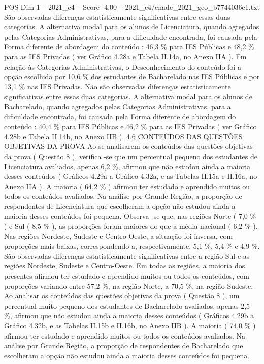 \begin{textsample}{POS Dim 1 – 2021\_c4 – Score -4.00 – 2021\_c4/enade\_2021\_geo\_b7744036e1.txt}
São observadas diferenças estatisticamente significativas entre essas duas categorias.
A alternativa modal para os alunos de Licenciatura, quando agregados pelas Categorias Administrativas, para a dificuldade encontrada, foi causada pela Forma diferente de abordagem do conteúdo : 46,3 \% para IES Públicas e 48,2 \% para as IES Privadas ( ver Gráfico 4.28a e Tabela II.14a, no Anexo IIA ).
Em relação às Categorias Administrativas, o Desconhecimento do conteúdo foi a opção escolhida por 10,6 \% dos estudantes de Bacharelado nas IES Públicas e por 13,1 \% nas IES Privadas.
Não são observadas diferenças estatisticamente significativas entre essas duas categorias.
A alternativa modal para os alunos de Bacharelado, quando agregados pelas Categorias Administrativas, para a dificuldade encontrada, foi causada pela Forma diferente de abordagem do conteúdo : 40,4 \% para IES Públicas e 46,2 \% para as IES Privadas ( ver Gráfico 4.28b e Tabela II.14b, no Anexo IIB ). 4.6 CONTEÚDOS DAS QUESTÕES OBJETIVAS DA PROVA Ao se analisarem os conteúdos das questões objetivas da prova ( Questão 8 ), verifica -se que um percentual pequeno dos estudantes de Licenciatura avaliados, apenas 6,2 \%, afirmou que não estudou ainda a maioria desses conteúdos ( Gráficos 4.29a a Gráfico 4.32a, e as Tabelas II.15a e II.16a, no Anexo IIA ).
A maioria ( 64,2 \% ) afirmou ter estudado e aprendido muitos ou todos os conteúdos avaliados.
Na análise por Grande Região, a proporção de respondentes de Licenciatura que escolheram a opção não estudou ainda a maioria desses conteúdos foi pequena.
Observa -se que, nas regiões Norte ( 7,0 \% ) e Sul ( 8,5 \% ), as proporções foram maiores do que a média nacional ( 6,2 \% ).
Nas regiões Nordeste, Sudeste e Centro-Oeste, a situação foi inversa, com proporções mais baixas, correspondendo a, respectivamente, 5,1 \%, 5,4 \% e 4,9 \%.
São observadas diferenças estatisticamente significativas entre a região Sul e as regiões Nordeste, Sudeste e Centro-Oeste.
Em todas as regiões, a maioria dos presentes afirmou ter estudado e aprendido muitos ou todos os conteúdos, com proporções variando entre 57,2 \%, na região Norte, a 70,5 \%, na região Sudeste.
Ao analisar os conteúdos das questões objetivas da prova ( Questão 8 ), um percentual muito pequeno dos estudantes de Bacharelado avaliados, apenas 2,5 \%, afirmou que não estudou ainda a maioria desses conteúdos ( Gráficos 4.29b a Gráfico 4.32b, e as Tabelas II.15b e II.16b, no Anexo IIB ).
A maioria ( 74,0 \% ) afirmou ter estudado e aprendido muitos ou todos os conteúdos avaliados.
Na análise por Grande Região, a proporção de respondentes de Bacharelado que escolheram a opção não estudou ainda a maioria desses conteúdos foi pequena.

\end{textsample}
